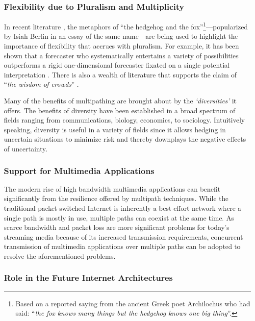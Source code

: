 \documentclass[10pt]{IEEEtran}
\begin{document}
\vspace{1mm}
\subsubsection{Flexibility due to Pluralism and Multiplicity}

In recent literature \cite{kahneman2011thinking}, the metaphors of ``the hedgehog and the fox''\footnote{Based on a reported saying from the ancient Greek poet Archilochus who had said: ``\textit{the fox knows many things but the hedgehog knows one big thing}''.}---popularized by Isiah Berlin in an essay of the same name---are being used to highlight the importance of flexibility that accrues with pluralism. For example, it has been shown that a forecaster who systematically entertains a variety of possibilities outperforms a rigid one-dimensional forecaster fixated on a single potential interpretation \cite{tetlock2005expert}. There is also a wealth of literature that supports the claim of ``\textit{the wisdom of crowds}'' \cite{surowiecki2005wisdom}. 

Many of the benefits of multipathing are brought about by the \textit{`diversities'} it offers. The benefits of diversity have been established in a broad spectrum of fields ranging from communications, biology, economics, to sociology. Intuitively speaking, diversity is useful in a variety of fields since it allows hedging in uncertain situations to minimize risk and thereby downplays the negative effects of uncertainty.



\vspace{1mm}
\subsubsection{Support for Multimedia Applications} The modern rise of high bandwidth multimedia applications can benefit significantly from the resilience offered by multipath techniques. While the traditional packet-switched Internet is inherently a best-effort network where a single path is mostly in use, multiple paths can coexist at the same time. As scarce bandwidth and packet loss are more significant problems for today's streaming media because of its increased transmission requirements, concurrent transmission of multimedia applications over multiple paths can be adopted to resolve the aforementioned problems.

\vspace{1mm}
\subsubsection{Role in the Future Internet Architectures} 
\end{document}
